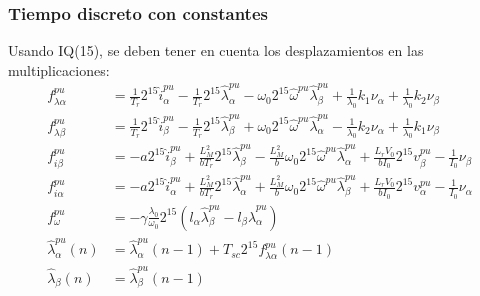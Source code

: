 \documentclass{article}
\begin{document}
        \subsubsection{Tiempo discreto con constantes}
            Usando IQ(15), se deben tener en cuenta los desplazamientos en las multiplicaciones:
            \begin{equation}
                \begin{aligned}
                    f_{\lambda\alpha}^{pu} &=  \frac{1}{T_r} 2^{15} \hat{i}_\alpha^{pu}
                        - \frac{1}{T_r}2^{15} \hat{\lambda}_\alpha^{pu}  
                        - \omega_0 2^{15} \hat{\omega}^{pu} \hat{\lambda}_\beta^{pu} 
                        + \frac{1}{\lambda_0} k_1\nu_\alpha + \frac{1}{\lambda_0} k_2\nu_\beta  \\
                    f_{\lambda\beta}^{pu} &=  \frac{1}{T_r} 2^{15} \hat{i}_\beta^{pu} 
                        - \frac{1}{T_r}2^{15} \hat{\lambda}_\beta^{pu}  
                        + \omega_0 2^{15} \hat{\omega}^{pu} \hat{\lambda}_\alpha^{pu} 
                        - \frac{1}{\lambda_0} k_2\nu_\alpha + \frac{1}{\lambda_0} k_1\nu_\beta  \\
                    f_{i\beta}^{pu} &=  -a 2^{15} \hat{i}_\beta^{pu} 
                        + \frac{L_M^2}{b T_r}2^{15}  \hat{\lambda}_\beta^{pu}  
                        - \frac{L_M^2}{b} \omega_0 2^{15}    \hat{\omega}^{pu} \hat{\lambda}_\alpha^{pu}
                        + \frac{L_r V_0}{b I_0}2^{15} v_\beta^{pu} 
                        - \frac{1}{I_0} \nu_\beta \\
                    f_{i\alpha}^{pu} &=  -a 2^{15} \hat{i}_\alpha^{pu} 
                        + \frac{L_M^2}{b T_r}2^{15}  \hat{\lambda}_\alpha^{pu}  
                        +  \frac{L_M^2}{b} \omega_0 2^{15}   \hat{\omega}^{pu} \hat{\lambda}_\beta^{pu}
                        + \frac{L_r V_0}{b I_0}2^{15} v_\alpha^{pu}
                        - \frac{1}{I_0} \nu_\alpha \\
                    f_\omega^{pu} &=  -\gamma \frac{\lambda_0}{\omega_0}2^{15}
                        \left( 
                            l_\alpha \hat{\lambda}_\beta^{pu} 
                            - l_\beta \hat{\lambda}_\alpha^{pu}  
                        \right) \\
                    \hat{\lambda}_\alpha^{pu}(n) &= \hat{\lambda}_\alpha^{pu}(n-1)
                        + T_{sc} 2^{15} f_{\lambda\alpha}^{pu}(n-1)  \\
                    \hat{\lambda}_\beta(n) &= \hat{\lambda}_\beta^{pu}(n-1)

\end{aligned}
\end{equation}
\end{document}
